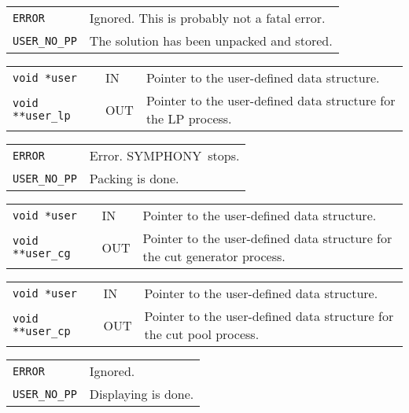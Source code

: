 \documentclass[twoside,11pt]{article}
\begin{document}
{\newpage
\clearpage
\samepage \begin{tabular}{lp{371.195pt}}
{\tt ERROR} & Ignored. This is probably not a fatal error.\\ 
{\tt USER\_NO\_PP} & The solution has been unpacked and stored. \\ 
\end{tabular}
}

{\newpage
\clearpage
\samepage \begin{tabular}{llp{322.645pt}}
{\tt void *user} & IN & Pointer to the user-defined data structure. \\ 
{\tt void **user\_lp} & OUT & Pointer to the user-defined data
structure for the LP process. \\ 
\end{tabular}
}

{\newpage
\clearpage
\samepage \begin{tabular}{lp{371.195pt}}
{\tt ERROR} & Error. {\sc SYMPHONY}\ stops. \\ 
{\tt USER\_NO\_PP} & Packing is done. \\ 
\end{tabular}
}

{\newpage
\clearpage
\samepage \begin{tabular}{llp{322.645pt}}
{\tt void *user} & IN & Pointer to the user-defined data structure. \\ 
{\tt void **user\_cg} & OUT & Pointer to the user-defined data
structure for the cut generator process. \\ 
\end{tabular}
}

{\newpage
\clearpage
\samepage \begin{tabular}{llp{322.645pt}}
{\tt void *user} & IN & Pointer to the user-defined data structure. \\ 
{\tt void **user\_cp} & OUT & Pointer to the user-defined data
structure for the cut pool process. \\ 
\end{tabular}
}

{\newpage
\clearpage
\samepage \begin{tabular}{lp{371.195pt}}
{\tt ERROR} & Ignored. \\ 
{\tt USER\_NO\_PP} & Displaying is done. \\ 
\end{tabular}
}
\end{document}
